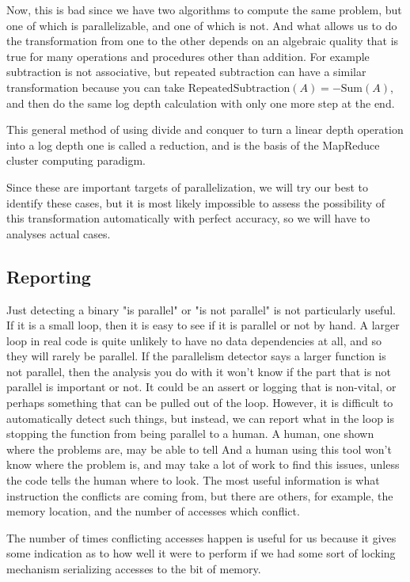 \documentclass[12pt,twoside]{reedthesis}
\begin{document}
		Now, this is bad since we have two algorithms to compute the same problem, but one of which is parallelizable, and one of which is not. And what allows us to do the transformation from one to the other depends on an algebraic quality that is true for many operations and procedures other than addition. For example subtraction is not associative, but repeated subtraction can have a similar transformation because you can take $\text{RepeatedSubtraction}(A) = -\text{Sum}(A)$, and then do the same log depth calculation with only one more step at the end.

		This general method of using divide and conquer to turn a linear depth operation into a log depth one is called a reduction, and is the basis of the MapReduce cluster computing paradigm.

		Since these are important targets of parallelization, we will try our best to identify these cases, but it is most likely impossible to assess the possibility of this transformation automatically with perfect accuracy, so we will have to analyses actual cases.

		\subsection{Reporting}

		Just detecting a binary "is parallel" or "is not parallel" is not particularly useful. If it is a small loop, then it is easy to see if it is parallel or not by hand. A larger loop in real code is quite unlikely to have no data dependencies at all, and so they will rarely be parallel. If the parallelism detector says a larger function is not parallel, then the analysis you do with it won't know if the part that is not parallel is important or not. It could be an assert or logging that is non-vital, or perhaps something that can be pulled out of the loop. However, it is difficult to automatically detect such things, but instead, we can report what in the loop is stopping the function from being parallel to a human. A human, one shown where the problems are, may be able to tell  And a human using this tool won't know where the problem is, and may take a lot of work to find this issues, unless the code tells the human where to look. The most useful information is what instruction the conflicts are coming from, but there are others, for example, the memory location, and the number of accesses which conflict.

		The number of times conflicting accesses happen is useful for us because it gives some indication as to how well it were to perform if we had some sort of locking mechanism serializing accesses to the bit of memory.
\end{document}
